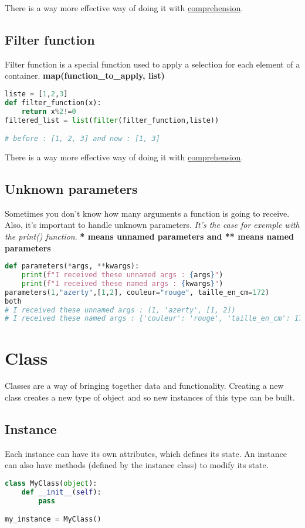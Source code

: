\documentclass[a4paper, 12pt, titlepage]{scrartcl} %
\begin{document}
There is a way more effective way of doing it with \hyperref[Comprehension]{comprehension}.

\subsection{Filter function}
Filter function is a special function used to apply a selection for each element of a container. \textbf{map(function\_to\_apply, list)}
\begin{lstlisting}[language=Python]
liste = [1,2,3]
def filter_function(x):
	return x%2!=0
filtered_list = list(filter(filter_function,liste))

# before : [1, 2, 3] and now : [1, 3]
\end{lstlisting}

There is a way more effective way of doing it with \hyperref[Comprehension]{comprehension}.

\subsection{Unknown parameters}
Sometimes you don't know how many arguments a function is going to receive. Also, it's important to handle unknown parameters. \textit{It's the case for exemple with the print() function}. \textbf{* means unnamed parameters and ** means named parameters}
\begin{lstlisting}[language=Python]
def parameters(*args, **kwargs):
	print(f"I received these unnamed args : {args}")
	print(f"I received these named args : {kwargs}")
parameters(1,"azerty",[1,2], couleur="rouge", taille_en_cm=172)
both
# I received these unnamed args : (1, 'azerty', [1, 2])
# I received these named args : {'couleur': 'rouge', 'taille_en_cm': 172}
\end{lstlisting}

\newpage
\section{Class}
\label{sec:Class}
Classes are a way of bringing together data and functionality. Creating a new class creates a new type of object and so new instances of this type can be built.\newline

\subsection{Instance}
Each instance can have its own attributes, which defines its state. An instance can also have methods (defined by the instance class) to modify its state.
\begin{lstlisting}[language=Python]
class MyClass(object):
	def __init__(self):
		pass

my_instance = MyClass()
\end{lstlisting}
\end{document}
